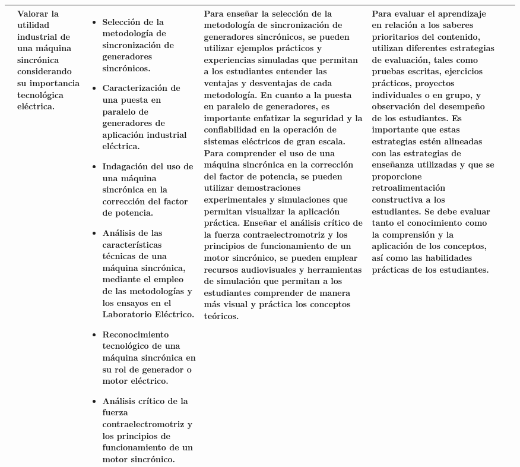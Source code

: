 \documentclass[main]{subfiles}
\newcommand{\recursos}{\rotatebox[origin=r]{90}{Pizarrón, proyectores, videos, simuladores, libros de texto, materiales manipulativos y plataformas digitales.}}
\newcommand{\tiempos}{\rotatebox[origin=r]{90}{8 Semanas}}
\newcommand{\evaluacion}{Para evaluar el aprendizaje en relación a los saberes prioritarios del contenido, utilizan diferentes estrategias de evaluación, tales como pruebas escritas, ejercicios prácticos, proyectos individuales o en grupo, y observación del desempeño de los estudiantes. Es importante que estas estrategias estén alineadas con las estrategias de enseñanza utilizadas y que se proporcione retroalimentación constructiva a los estudiantes. Se debe evaluar tanto el conocimiento como la comprensión y la aplicación de los conceptos, así como las habilidades prácticas de los estudiantes.}
\begin{document}
\begin{longtable}{|p{0.5cm}|p{1.5cm}|p{3.5cm}|p{3.5cm}|p{4cm}|p{.5cm}|p{0.5cm}|}
 & Valorar la utilidad industrial
de una máquina sincrónica
considerando su
importancia tecnológica
eléctrica. & \begin{itemize}
    \item Selección de la metodología de sincronización de
generadores sincrónicos.
\item Caracterización de una puesta en paralelo de
generadores de aplicación industrial eléctrica.
\item Indagación del uso de una máquina sincrónica en la
corrección del factor de potencia.
\item Análisis de las características técnicas de una máquina
sincrónica, mediante el empleo de las metodologías y los
ensayos en el Laboratorio Eléctrico.
\item Reconocimiento tecnológico de una máquina sincrónica
en su rol de generador o motor eléctrico.
\item Análisis crítico de la fuerza contraelectromotriz y los
principios de funcionamiento de un motor sincrónico. 
\end{itemize}& Para enseñar la selección de la metodología de sincronización de generadores sincrónicos, se pueden utilizar ejemplos prácticos y experiencias simuladas que permitan a los estudiantes entender las ventajas y desventajas de cada metodología. En cuanto a la puesta en paralelo de generadores, es importante enfatizar la seguridad y la confiabilidad en la operación de sistemas eléctricos de gran escala. Para comprender el uso de una máquina sincrónica en la corrección del factor de potencia, se pueden utilizar demostraciones experimentales y simulaciones que permitan visualizar la aplicación práctica. Enseñar el análisis crítico de la fuerza contraelectromotriz y los principios de funcionamiento de un motor sincrónico, se pueden emplear recursos audiovisuales y herramientas de simulación que permitan a los estudiantes comprender de manera más visual y práctica los conceptos teóricos.& \evaluacion & \recursos& \tiempos \\ \hline




\end{longtable}
\end{document}
